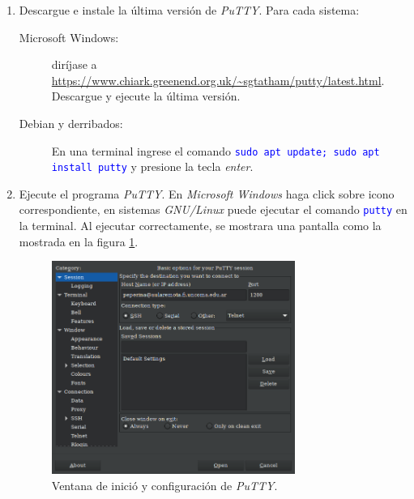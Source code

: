 \documentclass[12pt]{article}
\newcommand{\cw}[1]{\texttt{\textcolor{blue}{#1}}}
\begin{document}
\begin{enumerate}
    \item Descargue e instale la última versión de \emph{PuTTY}. Para cada
        sistema:

        \begin{description}

            \item[Microsoft Windows:] diríjase a
                \url{https://www.chiark.greenend.org.uk/~sgtatham/putty/latest.html}.
                Descargue y ejecute la última versión.

            \item[Debian y derribados:] En una terminal ingrese el comando
                \cw{sudo apt update; sudo apt install putty} y presione la
                tecla \emph{enter}.

        \end{description}

    \item Ejecute el programa \emph{PuTTY}. En \emph{Microsoft Windows} haga
        click sobre icono correspondiente, en sistemas \emph{GNU/Linux} puede
        ejecutar el comando \cw{putty} en la terminal. Al ejecutar
        correctamente, se mostrara una pantalla como la mostrada en la figura
        \ref{imgPuTTY}.

\begin{figure}[!htb]

    \centering

    \includegraphics[width=0.75\textwidth]{img/putty.png}

    \caption{Ventana de inició y configuración de
    \emph{PuTTY}.}

    \label{imgPuTTY}


\end{figure}
\end{enumerate}
\end{document}
